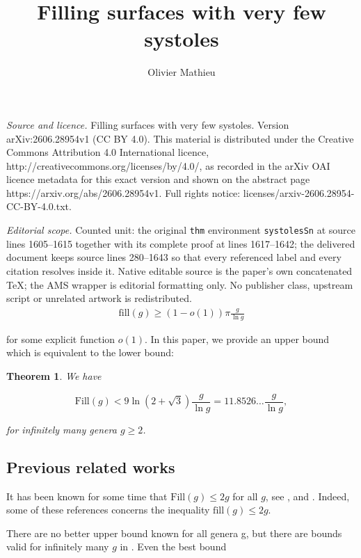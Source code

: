 \documentclass[10pt,a4paper]{amsart}
\renewcommand{\fill}{\mathrm{fill}}
\newcommand{\Fill}{\mathrm{Fill}}
\newtheorem{thm}[lemma]{Theorem}
\begin{document}
\title[Filling surfaces with very few systoles]{Filling surfaces with very few systoles}
\author{Olivier Mathieu}
\date{}
\maketitle
\noindent\emph{Source and licence.} Filling surfaces with very few systoles. Version arXiv:2606.28954v1 (CC BY 4.0). This material is distributed under the Creative Commons Attribution 4.0 International licence, http://creativecommons.org/licenses/by/4.0/, as recorded in the arXiv OAI licence metadata for this exact version and shown on the abstract page https://arxiv.org/abs/2606.28954v1. Full rights notice: licenses/arxiv-2606.28954-CC-BY-4.0.txt.\par\smallskip
\noindent\textit{Editorial scope.} Counted unit: the original \texttt{thm} environment \texttt{systolesSn} at source lines 1605--1615 together with its complete proof at lines 1617--1642; the delivered document keeps source lines 280--1643 so that every referenced label and every citation resolves inside it. Native editable source is the paper's own concatenated TeX; the AMS wrapper is editorial formatting only. No publisher class, upstream script or unrelated artwork is redistributed.
\begin{align}
\fill(g)\geq (1-o(1)) \pi \frac{g}{\ln g} \label{APPbound}
\end{align}

\noindent for some explicit function $o(1)$. In this
paper, we provide an upper bound which is equivalent to the lower bound:

\begin{thm}\label{main} We have

$$\Fill(g)<9\ln(2+\sqrt{3}) \frac{g}{\ln g}=11.8526\ldots \frac{g}{\ln g},$$

for infinitely many genera $g\geq 2$.
\end{thm}


\subsection*{{ Previous related works}}

It has been known for some time that  $\Fill(g)\leq 2g$ for all $g$,
see \cite{SS},\cite{APP} and \cite{Sanki}. Indeed,   some of these references concerns the inequality  
$\fill(g)\leq 2g$.  

There are no better upper  bound known for all genera g, but there are
bounds valid for infinitely many $g$ in \cite{FB20}\cite{IM}\cite{Mathieu}.
Even the best bound 
 
\end{document}
